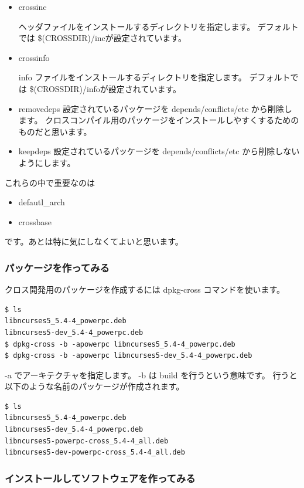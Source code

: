 \documentclass[mingoth]{jsarticle}
\begin{document}
\begin{itemize}
\item crossinc

	ヘッダファイルをインストールするディレクトリを指定します。
	デフォルトでは \$(CROSSDIR)/incが設定されています。
	
\item crossinfo

	info ファイルをインストールするディレクトリを指定します。
	デフォルトでは \$(CROSSDIR)/infoが設定されています。
	
\item removedeps
	設定されているパッケージを depends/conflicts/etc から削除します。
	クロスコンパイル用のパッケージをインストールしやすくするためのものだと思います。
	
\item keepdeps
	設定されているパッケージを depends/conflicts/etc から削除しないようにします。

\end{itemize}

これらの中で重要なのは
\begin{itemize}
 \item defautl\_arch
 \item crossbase
\end{itemize}
です。あとは特に気にしなくてよいと思います。

\subsubsection{パッケージを作ってみる}
クロス開発用のパッケージを作成するには dpkg-cross コマンドを使います。

\begin{verbatim}
$ ls 
libncurses5_5.4-4_powerpc.deb
libncurses5-dev_5.4-4_powerpc.deb
$ dpkg-cross -b -apowerpc libncurses5_5.4-4_powerpc.deb
$ dpkg-cross -b -apowerpc libncurses5-dev_5.4-4_powerpc.deb
\end{verbatim}
-a でアーキテクチャを指定します。
-b は build を行うという意味です。
行うと以下のような名前のパッケージが作成されます。
\begin{verbatim}
$ ls
libncurses5_5.4-4_powerpc.deb
libncurses5-dev_5.4-4_powerpc.deb
libncurses5-powerpc-cross_5.4-4_all.deb
libncurses5-dev-powerpc-cross_5.4-4_all.deb
\end{verbatim}

\subsubsection{インストールしてソフトウェアを作ってみる}
\end{document}
